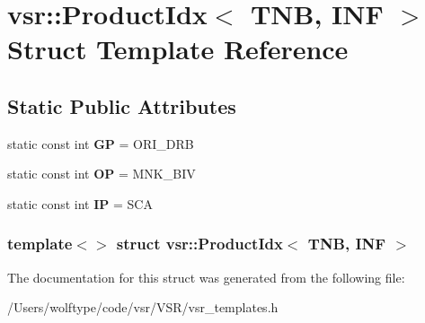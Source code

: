 \hypertarget{structvsr_1_1_product_idx_3_01_t_n_b_00_01_i_n_f_01_4}{\section{vsr\-:\-:Product\-Idx$<$ T\-N\-B, I\-N\-F $>$ Struct Template Reference}
\label{structvsr_1_1_product_idx_3_01_t_n_b_00_01_i_n_f_01_4}
}
\subsection*{Static Public Attributes}
\begin{DoxyCompactItemize}
\item 
\hypertarget{structvsr_1_1_product_idx_3_01_t_n_b_00_01_i_n_f_01_4_a4fce804fc18b39f1625d89ee00deee33}{static const int {\bfseries G\-P} = O\-R\-I\-\_\-\-D\-R\-B}\label{structvsr_1_1_product_idx_3_01_t_n_b_00_01_i_n_f_01_4_a4fce804fc18b39f1625d89ee00deee33}

\item 
\hypertarget{structvsr_1_1_product_idx_3_01_t_n_b_00_01_i_n_f_01_4_af3f0b8a86340659226d298aa42472d22}{static const int {\bfseries O\-P} = M\-N\-K\-\_\-\-B\-I\-V}\label{structvsr_1_1_product_idx_3_01_t_n_b_00_01_i_n_f_01_4_af3f0b8a86340659226d298aa42472d22}

\item 
\hypertarget{structvsr_1_1_product_idx_3_01_t_n_b_00_01_i_n_f_01_4_aad6b2900e21426121dd2a1a09ee6f011}{static const int {\bfseries I\-P} = S\-C\-A}\label{structvsr_1_1_product_idx_3_01_t_n_b_00_01_i_n_f_01_4_aad6b2900e21426121dd2a1a09ee6f011}

\end{DoxyCompactItemize}
\subsubsection*{template$<$$>$ struct vsr\-::\-Product\-Idx$<$ T\-N\-B, I\-N\-F $>$}



The documentation for this struct was generated from the following file\-:\begin{DoxyCompactItemize}
\item 
/\-Users/wolftype/code/vsr/\-V\-S\-R/vsr\-\_\-templates.\-h\end{DoxyCompactItemize}
